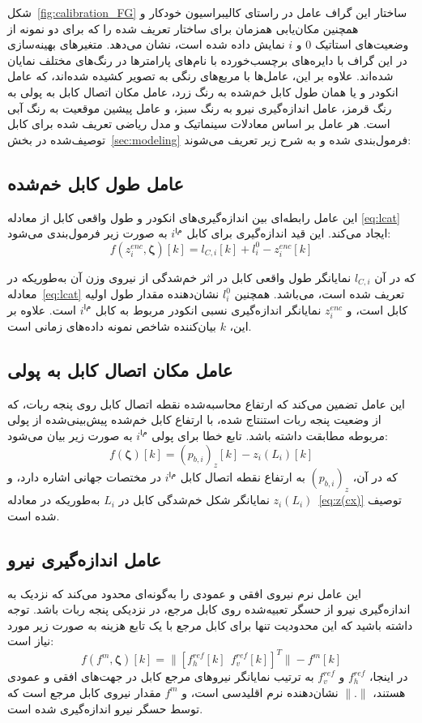 شکل~\ref{fig:calibration_FG} ساختار این گراف عامل در راستای کالیبراسیون خودکار و همچنین مکان‌یابی همزمان برای ساختار تعریف شده را که برای دو نمونه از وضعیت‌های استاتیک $0$ و $i$ نمایش داده شده است، نشان می‌دهد. متغیرهای بهینه‌سازی در این گراف با دایره‌های برچسب‌خورده با نام‌های پارامتر‌ها در رنگ‌های مختلف نمایان شده‌اند.
علاوه بر این، عامل‌ها با مربع‌های رنگی به تصویر کشیده شده‌اند، که عامل انکودر و یا همان طول کابل خم‌شده به رنگ زرد، عامل مکان اتصال کابل به پولی به رنگ قرمز، عامل اندازه‌گیری نیرو به رنگ سبز، و عامل پیشین موقعیت به رنگ آبی است. هر عامل بر اساس معادلات سینماتیک و مدل ریاضی تعریف شده برای کابل توصیف‌شده در بخش~\ref{sec:modeling} فرمول‌بندی شده و به شرح زیر تعریف می‌شوند:

\subsection{عامل طول کابل خم‌شده}
این عامل رابطه‌ای بین اندازه‌گیری‌های انکودر و طول واقعی کابل از معادله
\ref{eq:lcat}
 ایجاد می‌کند. این قید اندازه‌گیری برای کابل $i^{ام}$ به صورت زیر فرمول‌بندی می‌شود:
\begin{equation}
	f(z^{enc}_{i}, \bm{\zeta})[k] = l_{C,i}[k] + l^0_i - z^{enc}_{i}[k]
\end{equation}

که در آن $l_{C,i}$ نمایانگر طول واقعی کابل در اثر خم‌شدگی از نیروی وزن آن  به‌طوریکه در معادله~\ref{eq:lcat} تعریف شده است، می‌باشد. همچنین $l^0_i$ نشان‌دهنده مقدار طول اولیه کابل است، و $z^{enc}_{i}$ نمایانگر اندازه‌گیری نسبی انکودر مربوط به کابل $i^{ام}$ است. علاوه بر این، $k$ بیان‌کننده شاخص نمونه داده‌های زمانی است.

\subsection{عامل مکان اتصال کابل به پولی}
این عامل تضمین می‌کند که ارتفاع محاسبه‌شده نقطه اتصال کابل روی پنجه ربات، که از وضعیت پنجه ربات استنتاج شده، با ارتفاع کابل خم‌شده پیش‌بینی‌شده از پولی مربوطه مطابقت داشته باشد. تابع خطا برای پولی $i^{ام}$ به صورت زیر بیان می‌شود:
\begin{equation}
	f(\bm{\zeta})[k] = (p_{b,i})_z [k] - z_i(L_i)[k]
\end{equation}
که در آن، $(p_{b,i})_z$ به ارتفاع نقطه اتصال کابل $i^{ام}$ در مختصات جهانی اشاره دارد، و $z_i(L_i)$ نمایانگر شکل خم‌شدگی کابل در $L_i$ به‌طوریکه در معادله~\ref{eq:z(cx)} توصیف شده است.

\subsection{عامل اندازه‌گیری نیرو}
این عامل نرم نیروی افقی و عمودی را به‌گونه‌ای محدود می‌کند که نزدیک به اندازه‌گیری نیرو از حسگر تعبیه‌شده روی کابل مرجع، در نزدیکی پنجه ربات باشد. توجه داشته باشید که این محدودیت تنها برای کابل مرجع با یک تابع هزینه به صورت زیر مورد نیاز است:
\begin{equation}
	f(f^{m}, \bm{\zeta})[k] = \| [f^{ref}_{h}[k]~~f^{ref}_{v}[k]]^T \| - f^{m}[k]
\end{equation}
در اینجا، $f^{ref}_{h}$ و $f^{ref}_{v}$ به ترتیب نمایانگر نیروهای مرجع کابل در جهت‌های افقی و عمودی هستند، $\|.\|$ نشان‌دهنده نرم اقلیدسی است، و $f^{m}$ مقدار  نیروی کابل مرجع است که توسط حسگر نیرو اندازه‌گیری شده است.

